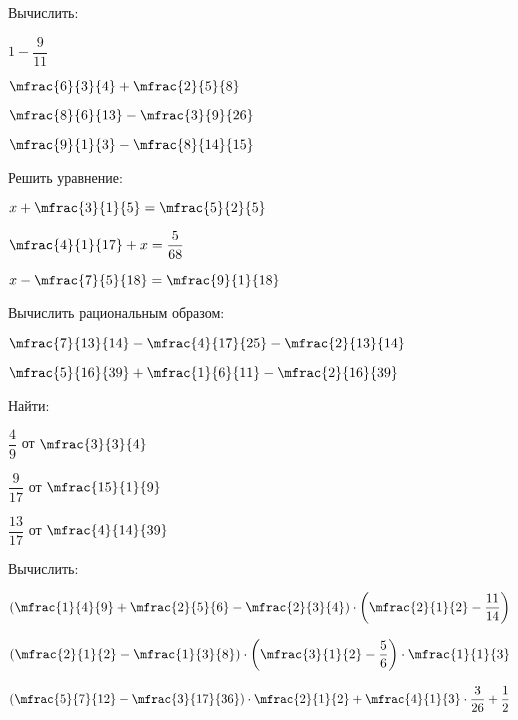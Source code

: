 \begin{class}[type=homework, number=1]
	\begin{listofex}
		\item Вычислить:
		\begin{enumcols}[itemcolumns=4]
			\item \( 1-\dfrac{9}{11} \)
			\item \( \mfrac{6}{3}{4}+\mfrac{2}{5}{8} \)
			\item \( \mfrac{8}{6}{13}-\mfrac{3}{9}{26} \)
			\item \( \mfrac{9}{1}{3}-\mfrac{8}{14}{15} \)
		\end{enumcols}
		\item Решить уравнение:
		\begin{enumcols}[itemcolumns=3]
			\item \( x+\mfrac{3}{1}{5}=\mfrac{5}{2}{5} \)
			\item \( \mfrac{4}{1}{17}+x=\dfrac{5}{68} \)
			\item \( x-\mfrac{7}{5}{18}=\mfrac{9}{1}{18} \)
		\end{enumcols}
		\item Вычислить рациональным образом:
		\begin{enumcols}[itemcolumns=2]
		\item \( \mfrac{7}{13}{14}-\mfrac{4}{17}{25}-\mfrac{2}{13}{14} \)
		\item \( \mfrac{5}{16}{39}+\mfrac{1}{6}{11}-\mfrac{2}{16}{39} \)
		\end{enumcols}
		\item Найти:
		\begin{enumcols}[itemcolumns=3]
			\item \( \dfrac{4}{9} \) от \( \mfrac{3}{3}{4} \)
			\item \( \dfrac{9}{17} \) от \( \mfrac{15}{1}{9} \)
			\item \( \dfrac{13}{17} \) от \( \mfrac{4}{14}{39} \)
		\end{enumcols}
		\item Вычислить: %
		\begin{enumcols}[itemcolumns=2]
			\item \( \left( \mfrac{1}{4}{9}+\mfrac{2}{5}{6}-\mfrac{2}{3}{4} \right)\cdot\left( \mfrac{2}{1}{2}-\dfrac{11}{14} \right) \)
			\item \( \left( \mfrac{2}{1}{2}-\mfrac{1}{3}{8} \right)\cdot\left( \mfrac{3}{1}{2}-\dfrac{5}{6} \right)\cdot\mfrac{1}{1}{3} \)
			\item \( \left( \mfrac{5}{7}{12}-\mfrac{3}{17}{36} \right)\cdot\mfrac{2}{1}{2}+\mfrac{4}{1}{3}\cdot\dfrac{3}{26}+\dfrac{1}{2} \)

\end{enumcols}
\end{listofex}
\end{class}
